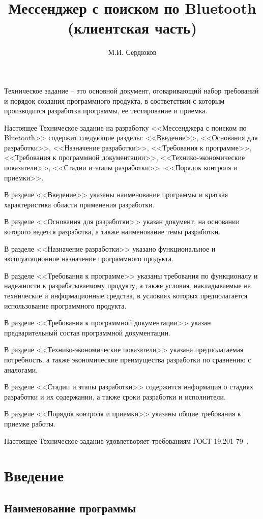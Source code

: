 \documentclass[techtask]{espd}
\author{М.И. Сердюков}
\title{Мессенджер с поиском по Bluetooth\\(клиентская часть)}
\begin{document}
\annotation
Техническое задание -- это основной документ, оговаривающий набор требований и порядок создания программного продукта, в соответствии с которым производится разработка программы, ее тестирование и приемка.

Настоящее Техническое задание на разработку <<Мессенджера с поиском по Bluetooth>> содержит следующие разделы: <<Введение>>, <<Основания для разработки>>, <<Назначение разработки>>, <<Требования к программе>>, <<Требования к программной документации>>, <<Технико-экономические показатели>>, <<Стадии и этапы разработки>>, <<Порядок контроля и приемки>>.

В разделе <<Введение>> указаны наименование программы и краткая характеристика области применения разработки.

В разделе <<Основания для разработки>> указан документ, на основании которого ведется разработка, а также наименование темы разработки.

В разделе <<Назначение разработки>> указано функциональное и эксплуатационное назначение программного продукта.

В разделе <<Требования к программе>> указаны требования по функционалу и надежности к разрабатываемому продукту, а также условия, накладываемые на технические и информационные средства, в условиях которых предполагается использование программного продукта.

В разделе <<Требования к программной документации>> указан предварительный состав программной документации.

В разделе <<Технико-экономические показатели>> указана предполагаемая потребность, а также экономические преимущества разработки по сравнению с аналогами.

В разделе <<Стадии и этапы разработки>> содержится информация о стадиях разработки и их содержании, а также сроки разработки и исполнители.

В разделе <<Порядок контроля и приемки>> указаны общие требования к приемке работы.

Настоящее Техническое задание удовлетворяет требованиям ГОСТ 19.201-79~\cite{espd201}.

\tableofcontents

\section{Введение}
\subsection{Наименование программы}
\end{document}

